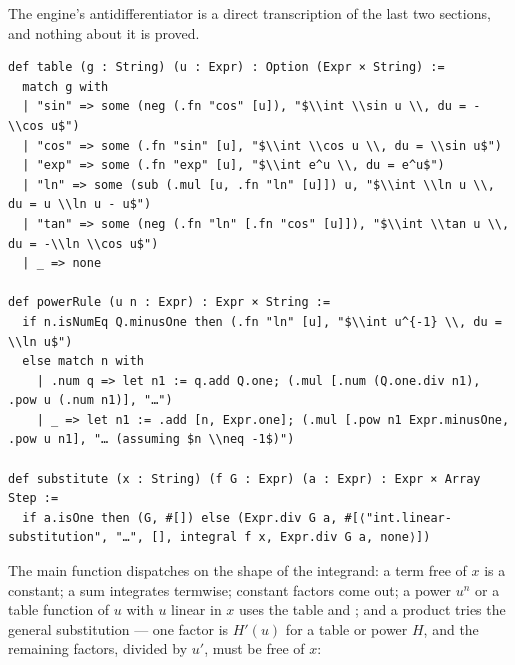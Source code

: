 The engine's antidifferentiator is a direct transcription of the last two sections, and nothing
about it is proved.

\begin{verbatim}
def table (g : String) (u : Expr) : Option (Expr × String) :=
  match g with
  | "sin" => some (neg (.fn "cos" [u]), "$\\int \\sin u \\, du = -\\cos u$")
  | "cos" => some (.fn "sin" [u], "$\\int \\cos u \\, du = \\sin u$")
  | "exp" => some (.fn "exp" [u], "$\\int e^u \\, du = e^u$")
  | "ln" => some (sub (.mul [u, .fn "ln" [u]]) u, "$\\int \\ln u \\, du = u \\ln u - u$")
  | "tan" => some (neg (.fn "ln" [.fn "cos" [u]]), "$\\int \\tan u \\, du = -\\ln \\cos u$")
  | _ => none

def powerRule (u n : Expr) : Expr × String :=
  if n.isNumEq Q.minusOne then (.fn "ln" [u], "$\\int u^{-1} \\, du = \\ln u$")
  else match n with
    | .num q => let n1 := q.add Q.one; (.mul [.num (Q.one.div n1), .pow u (.num n1)], "…")
    | _ => let n1 := .add [n, Expr.one]; (.mul [.pow n1 Expr.minusOne, .pow u n1], "… (assuming $n \\neq -1$)")

def substitute (x : String) (f G : Expr) (a : Expr) : Expr × Array Step :=
  if a.isOne then (G, #[]) else (Expr.div G a, #[⟨"int.linear-substitution", "…", [], integral f x, Expr.div G a, none⟩])
\end{verbatim}

The main function  dispatches on the shape of the integrand: a term free of $x$ is a
constant; a sum integrates termwise; constant factors come out; a power $u^n$ or a table
function of $u$ with $u$ linear in $x$ uses the table and ; and a product tries
the general substitution --- one factor is $H'(u)$ for a table or power $H$, and the remaining
factors, divided by $u'$, must be free of $x$:

